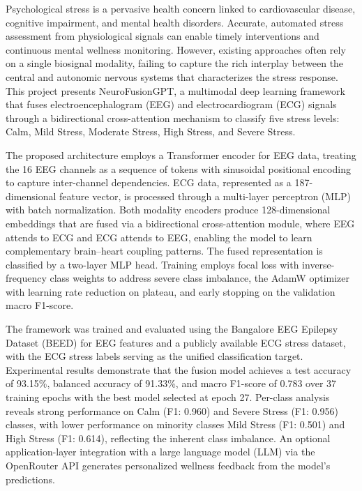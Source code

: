 \documentclass[12pt,letterpaper]{report}
\begin{document}
\vspace{0.5in}

Psychological stress is a pervasive health concern linked to cardiovascular disease, cognitive impairment, and mental health disorders. Accurate, automated stress assessment from physiological signals can enable timely interventions and continuous mental wellness monitoring. However, existing approaches often rely on a single biosignal modality, failing to capture the rich interplay between the central and autonomic nervous systems that characterizes the stress response. This project presents NeuroFusionGPT, a multimodal deep learning framework that fuses electroencephalogram (EEG) and electrocardiogram (ECG) signals through a bidirectional cross-attention mechanism to classify five stress levels: Calm, Mild Stress, Moderate Stress, High Stress, and Severe Stress.

The proposed architecture employs a Transformer encoder for EEG data, treating the 16 EEG channels as a sequence of tokens with sinusoidal positional encoding to capture inter-channel dependencies. ECG data, represented as a 187-dimensional feature vector, is processed through a multi-layer perceptron (MLP) with batch normalization. Both modality encoders produce 128-dimensional embeddings that are fused via a bidirectional cross-attention module, where EEG attends to ECG and ECG attends to EEG, enabling the model to learn complementary brain--heart coupling patterns. The fused representation is classified by a two-layer MLP head. Training employs focal loss with inverse-frequency class weights to address severe class imbalance, the AdamW optimizer with learning rate reduction on plateau, and early stopping on the validation macro F1-score.

The framework was trained and evaluated using the Bangalore EEG Epilepsy Dataset (BEED) for EEG features and a publicly available ECG stress dataset, with the ECG stress labels serving as the unified classification target. Experimental results demonstrate that the fusion model achieves a test accuracy of 93.15\%, balanced accuracy of 91.33\%, and macro F1-score of 0.783 over 37 training epochs with the best model selected at epoch 27. Per-class analysis reveals strong performance on Calm (F1: 0.960) and Severe Stress (F1: 0.956) classes, with lower performance on minority classes Mild Stress (F1: 0.501) and High Stress (F1: 0.614), reflecting the inherent class imbalance. An optional application-layer integration with a large language model (LLM) via the OpenRouter API generates personalized wellness feedback from the model's predictions.
\end{document}
